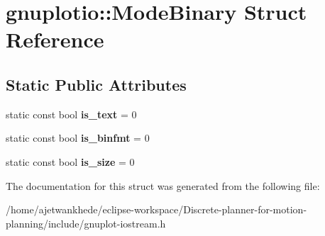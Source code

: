 \hypertarget{structgnuplotio_1_1ModeBinary}{}\section{gnuplotio\+:\+:Mode\+Binary Struct Reference}
\label{structgnuplotio_1_1ModeBinary}
\subsection*{Static Public Attributes}
\begin{DoxyCompactItemize}
\item 
\mbox{\label{structgnuplotio_1_1ModeBinary_ac89064b5df24f7ef4d765fdfde4fd1b6}} 
static const bool {\bfseries is\+\_\+text} = 0
\item 
\mbox{\label{structgnuplotio_1_1ModeBinary_aee724034dc3372b8e12b1187507bf136}} 
static const bool {\bfseries is\+\_\+binfmt} = 0
\item 
\mbox{\label{structgnuplotio_1_1ModeBinary_a6eae25ea662362bbb88bc987d6025290}} 
static const bool {\bfseries is\+\_\+size} = 0
\end{DoxyCompactItemize}


The documentation for this struct was generated from the following file\+:\begin{DoxyCompactItemize}
\item 
/home/ajetwankhede/eclipse-\/workspace/\+Discrete-\/planner-\/for-\/motion-\/planning/include/gnuplot-\/iostream.\+h\end{DoxyCompactItemize}
